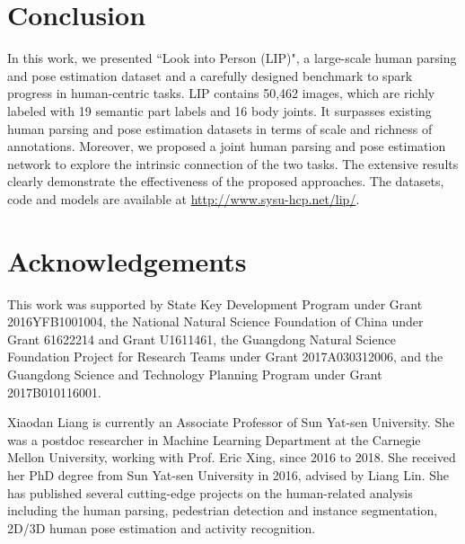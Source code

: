 \documentclass[10pt,journal,compsoc]{IEEEtran}
\begin{document}
\section{Conclusion}
In this work, we presented ``Look into Person (LIP)", a large-scale human parsing and pose estimation dataset and a carefully designed benchmark to spark progress in human-centric tasks. LIP contains 50,462 images, which are richly labeled with 19 semantic part labels and 16 body joints. It surpasses existing human parsing and pose estimation datasets in terms of scale and richness of annotations. Moreover, we proposed a joint human parsing and pose estimation network to explore the intrinsic connection of the two tasks. The extensive results clearly demonstrate the effectiveness of the proposed approaches. The datasets, code and models are available at \url{http://www.sysu-hcp.net/lip/}.








\section*{Acknowledgements}

This work was supported by State Key Development Program under Grant 2016YFB1001004, the National Natural Science Foundation of China under Grant 61622214 and Grant U1611461, the Guangdong Natural Science Foundation Project for Research Teams under Grant 2017A030312006, and the Guangdong Science and Technology Planning
Program under Grant 2017B010116001.

\ifCLASSOPTIONcaptionsoff
  \newpage
\fi{\small


}




\begin{IEEEbiography}{Xiaodan Liang}
is currently an Associate Professor of Sun Yat-sen University. She was a postdoc researcher in Machine Learning Department at the Carnegie Mellon University, working with Prof. Eric Xing, since 2016 to 2018. She received her PhD degree from Sun Yat-sen University in 2016, advised by Liang Lin. She has published several cutting-edge projects on the human-related analysis including the human parsing, pedestrian detection and instance segmentation, 2D/3D human pose estimation and activity recognition.
\end{IEEEbiography}
\end{document}
